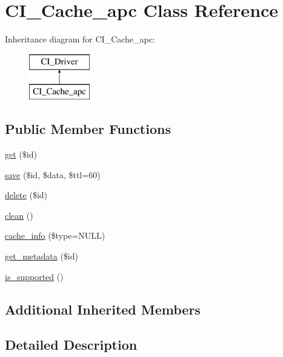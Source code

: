 \hypertarget{class_c_i___cache__apc}{\section{C\-I\-\_\-\-Cache\-\_\-apc Class Reference}
\label{class_c_i___cache__apc}
}
Inheritance diagram for C\-I\-\_\-\-Cache\-\_\-apc\-:\begin{figure}[H]
\begin{center}
\leavevmode
\includegraphics[height=2.000000cm]{class_c_i___cache__apc}
\end{center}
\end{figure}
\subsection*{Public Member Functions}
\begin{DoxyCompactItemize}
\item 
\hyperlink{class_c_i___cache__apc_a50e3bfb586b2f42932a6a93f3fbb0828}{get} (\$id)
\item 
\hyperlink{class_c_i___cache__apc_a747c50183a4ed7009899628fa75c562b}{save} (\$id, \$data, \$ttl=60)
\item 
\hyperlink{class_c_i___cache__apc_a2f8258add505482d7f00ea26493a5723}{delete} (\$id)
\item 
\hyperlink{class_c_i___cache__apc_adb40b812890a8bc058bf6b7a0e1a54d9}{clean} ()
\item 
\hyperlink{class_c_i___cache__apc_aa8b9c4d9f0387156736ccd8850f0727e}{cache\-\_\-info} (\$type=N\-U\-L\-L)
\item 
\hyperlink{class_c_i___cache__apc_a59635cf18e997c5141bffa05ff7622e0}{get\-\_\-metadata} (\$id)
\item 
\hyperlink{class_c_i___cache__apc_a98c68fd153468bc148c4ed8c716859fc}{is\-\_\-supported} ()
\end{DoxyCompactItemize}
\subsection*{Additional Inherited Members}


\subsection{Detailed Description}


